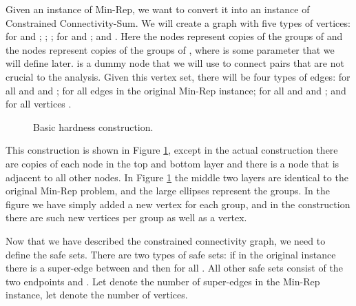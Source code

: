 \documentclass[11pt,letterpaper]{article}
\theoremstyle{definition}
\newcounter{note}[section]
\begin{document}
Given an instance of {\sc Min-Rep}, we want to convert it into an
instance of {\sc Constrained Connectivity-Sum}.  We will create a graph
with five types of vertices:  for  and ; ; ;  for  and ; and .
Here the  nodes represent  copies of the groups of  and the
 nodes represent  copies of the groups of , where  is some
parameter that we will define later.   is a dummy node that we will
use to connect pairs that are not crucial to the analysis.  Given
this vertex set, there will be four types of edges:  for all  and  and ;  for all edges  in the original {\sc Min-Rep}
  instance;  for all  and  and ; and  for all vertices .

\begin{figure}
\centerline{}
\caption{Basic hardness construction.}
\label{fig:CC_hard}
\end{figure}

This construction is shown in Figure \ref{fig:CC_hard}, except in the actual construction there are  copies of each node in the top and bottom layer and there is a  node that is adjacent to all other nodes.  In Figure \ref{fig:CC_hard} the middle two layers are identical to the original {\sc Min-Rep} problem, and the large ellipses represent the groups.  In the figure we have simply added a new vertex for each group, and in the construction there are  such new vertices per group as well as a  vertex.

Now that we have described the constrained connectivity graph, we need
to define the safe sets.  There are two types of safe sets: if in the
original instance there is a super-edge between  and  then
 for all .  All other safe sets consist of the two
endpoints and .  Let  denote the number of super-edges in
the {\sc Min-Rep} instance, let  denote the number of
vertices.
\end{document}
